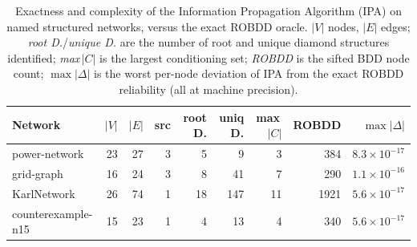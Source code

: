 
\begin{table}[t]
\centering
\caption{Exactness and complexity of the Information Propagation Algorithm (IPA) on named structured
networks, versus the exact ROBDD oracle. $|V|$ nodes, $|E|$ edges; \emph{root D.}/\emph{unique D.} are the
number of root and unique diamond structures identified; \emph{max\,$|C|$} is the largest conditioning set;
\emph{ROBDD} is the sifted BDD node count; $\max|\Delta|$ is the worst per-node deviation of IPA from the
exact ROBDD reliability (all at machine precision).}
\label{tab:structured}
\begin{tabular}{lrrrrrrrr}
\hline
Network & $|V|$ & $|E|$ & src & root D. & uniq D. & max\,$|C|$ & ROBDD & $\max|\Delta|$ \\
\hline
power-network      & 23 & 27 & 3 &  5 &   9 &  3 &  384 & $8.3\times10^{-17}$ \\
grid-graph         & 16 & 24 & 3 &  8 &  41 &  7 &  290 & $1.1\times10^{-16}$ \\
KarlNetwork        & 26 & 74 & 1 & 18 & 147 & 11 & 1921 & $5.6\times10^{-17}$ \\
counterexample-n15 & 15 & 23 & 1 &  4 &  13 &  4 &  340 & $5.6\times10^{-17}$ \\
\hline
\end{tabular}
\end{table}

